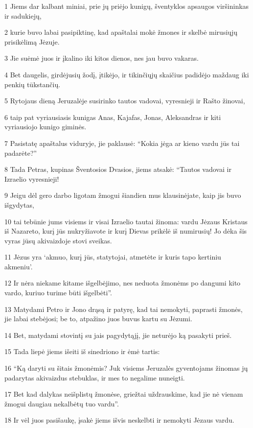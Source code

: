 \par 1 Jiems dar kalbant miniai, prie jų priėjo kunigų, šventyklos apsaugos viršininkas ir sadukiejų, 
\par 2 kurie buvo labai pasipiktinę, kad apaštalai mokė žmones ir skelbė mirusiųjų prisikėlimą Jėzuje. 
\par 3 Jie suėmė juos ir įkalino iki kitos dienos, nes jau buvo vakaras. 
\par 4 Bet daugelis, girdėjusių žodį, įtikėjo, ir tikinčiųjų skaičius padidėjo maždaug iki penkių tūkstančių. 
\par 5 Rytojaus dieną Jeruzalėje susirinko tautos vadovai, vyresnieji ir Rašto žinovai, 
\par 6 taip pat vyriausiasis kunigas Anas, Kajafas, Jonas, Aleksandras ir kiti vyriausiojo kunigo giminės. 
\par 7 Pasistatę apaštalus viduryje, jie paklausė: “Kokia jėga ar kieno vardu jūs tai padarėte?” 
\par 8 Tada Petras, kupinas Šventosios Dvasios, jiems atsakė: “Tautos vadovai ir Izraelio vyresnieji! 
\par 9 Jeigu dėl gero darbo ligotam žmogui šiandien mus klausinėjate, kaip jis buvo išgydytas, 
\par 10 tai tebūnie jums visiems ir visai Izraelio tautai žinoma: vardu Jėzaus Kristaus iš Nazareto, kurį jūs nukryžiavote ir kurį Dievas prikėlė iš numirusių! Jo dėka šis vyras jūsų akivaizdoje stovi sveikas. 
\par 11 Jėzus yra ‘akmuo, kurį jūs, statytojai, atmetėte ir kuris tapo kertiniu akmeniu’. 
\par 12 Ir nėra niekame kitame išgelbėjimo, nes neduota žmonėms po dangumi kito vardo, kuriuo turime būti išgelbėti”. 
\par 13 Matydami Petro ir Jono drąsą ir patyrę, kad tai nemokyti, paprasti žmonės, jie labai stebėjosi; be to, atpažino juos buvus kartu su Jėzumi. 
\par 14 Bet, matydami stovintį su jais pagydytąjį, jie neturėjo ką pasakyti prieš. 
\par 15 Tada liepė jiems išeiti iš sinedriono ir ėmė tartis: 
\par 16 “Ką daryti su šitais žmonėmis? Juk visiems Jeruzalės gyventojams žinomas jų padarytas akivaizdus stebuklas, ir mes to negalime nuneigti. 
\par 17 Bet kad dalykas neišplistų žmonėse, griežtai uždrauskime, kad jie nė vienam žmogui daugiau nekalbėtų tuo vardu”. 
\par 18 Ir vėl juos pasišaukę, įsakė jiems išvis neskelbti ir nemokyti Jėzaus vardu. 
